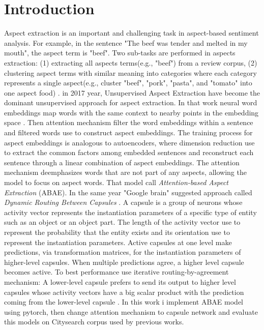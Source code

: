 \documentclass{article}
\begin{document}
\section{Introduction}
Aspect extraction is an important and challenging task in aspect-based sentiment analysis. For example, in the sentence "The beef was tender and melted in my mouth", the aspect term is "beef". Two sub-tasks are performed in aspects extraction: (1) extracting all aspects terms(e.g., "beef") from a review corpus, (2) clustering aspect terms with similar meaning into categories where each category represents a single aspect(e.g., cluster "beef", "pork", "pasta", and "tomato" into one aspect food) \cite{He2018ABAE}. in 2017 year, Unsupervised Aspect Extraction \cite{He2018ABAE} have become the dominant unsupervised approach for aspect extraction. In that work neural word embeddings map words with the same context to nearby points in the embedding space \cite{Mikolov2013W2V}. Then attention mechanism \cite{Bahdanau2015NMT} filter the word embeddings within a sentence and filtered words use to construct aspect embeddings. The training process for aspect embeddings is analogous to autoencoders, where dimension reduction use to extract the common factors among embedded sentences and reconstruct each sentence through a linear combination of aspect embeddings. The attention mechanism deemphasizes words that are not part of any aspects, allowing the model to focus on aspect words. That model call \textit{Attention-based Aspect Extraction} (ABAE). In the same year "Google brain" suggested approach called \textit{Dynamic Routing Between Capsules} \cite{Hinton2017DRBC}. A capsule is a group of neurons whose activity vector represents the instantiation parameters of a specific type of entity such as an object or an object part. The length of the activity vector use to represent the probability that the entity exists and its orientation use to represent the instantiation parameters. Active capsules at one level make predictions, via transformation matrices, for the instantiation parameters of higher-level capsules. When multiple predictions agree, a higher level capsule becomes active. To best performance use iterative routing-by-agreement mechanism: A lower-level capsule prefers to send its output to higher level capsules whose activity vectors have a big scalar product with the prediction coming from the lower-level capsule \cite{Hinton2017DRBC}. In this work i implement ABAE model using pytorch, then change attention mechanism to capsule network and evaluate this models on Citysearch corpus used by previous works\cite{Ganu2009BeyondTheStars}\cite{Brody2010UAS}\cite{Zhao2010JMA}\cite{He2018ABAE}.
\end{document}
